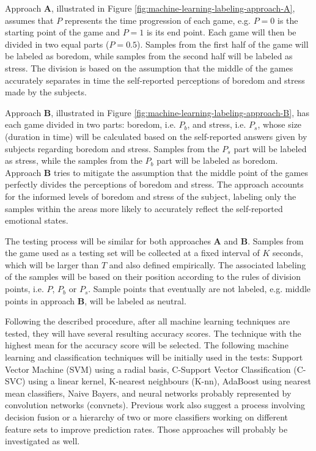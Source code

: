Approach \textbf{A}, illustrated in Figure \ref{fig:machine-learning-labeling-approach-A}, assumes that $P$ represents the time progression of each game, e.g. $P=0$ is the starting point of the game and $P=1$ is its end point. Each game will then be divided in two equal parts ($P=0.5$). Samples from the first half of the game will be labeled as boredom, while samples from the second half will be labeled as stress. The division is based on the assumption that the middle of the games accurately separates in time the self-reported perceptions of boredom and stress made by the subjects.

Approach \textbf{B}, illustrated in Figure \ref{fig:machine-learning-labeling-approach-B}, has each game divided in two parts: boredom, i.e. $P_b$, and stress, i.e. $P_s$, whose size (duration in time) will be calculated based on the self-reported answers given by subjects regarding boredom and stress. Samples from the $P_s$ part will be labeled as stress, while the samples from the $P_b$ part will be labeled as boredom. Approach \textbf{B} tries to mitigate the assumption that the middle point of the games perfectly divides the perceptions of boredom and stress. The approach accounts for the informed levels of boredom and stress of the subject, labeling only the samples within the areas more likely to accurately reflect the self-reported emotional states.

The testing process will be similar for both approaches \textbf{A} and \textbf{B}. Samples from the game used as a testing set will be collected at a fixed interval of $K$ seconds, which will be larger than $T$ and also defined empirically. The associated labeling of the samples will be based on their position according to the rules of division points, i.e. $P$, $P_b$ or $P_s$. Sample points that eventually are not labeled, e.g. middle points in approach \textbf{B}, will be labeled as neutral.

Following the described procedure, after all machine learning techniques are tested, they will have several resulting accuracy scores. The technique with the highest mean for the accuracy score will be selected. The following machine learning and classification techniques will be initially used in the tests: Support Vector Machine (SVM) using a radial basis, C-Support Vector Classification (C-SVC) using a linear kernel, K-nearest neighbours (K-nn), AdaBoost using nearest mean classifiers, Naive Bayers, and neural networks probably represented by convolution networks (convnets). Previous work \parencite{samara2016sensing,akakin2010spatiotemporal} also suggest a process involving decision fusion or a hierarchy of two or more classifiers working on different feature sets to improve prediction rates. Those approaches will probably be investigated as well.

